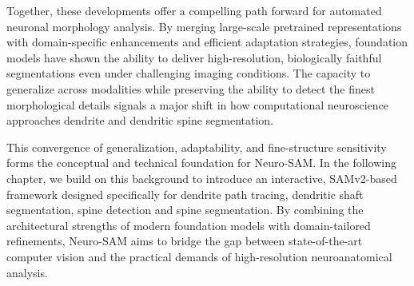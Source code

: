 Together, these developments offer a compelling path forward for automated neuronal morphology analysis. By merging large-scale pretrained representations with domain-specific enhancements and efficient adaptation strategies, foundation models have shown the ability to deliver high-resolution, biologically faithful segmentations even under challenging imaging conditions. The capacity to generalize across modalities while preserving the ability to detect the finest morphological details signals a major shift in how computational neuroscience approaches dendrite and dendritic spine segmentation.

This convergence of generalization, adaptability, and fine-structure sensitivity forms the conceptual and technical foundation for Neuro-\gls{SAM}. In the following chapter, we build on this background to introduce an interactive, \gls{SAMv2}-based framework designed specifically for dendrite path tracing, dendritic shaft segmentation, spine detection and spine segmentation. By combining the architectural strengths of modern foundation models with domain-tailored refinements, Neuro-\gls{SAM} aims to bridge the gap between state-of-the-art computer vision and the practical demands of high-resolution neuroanatomical analysis.

